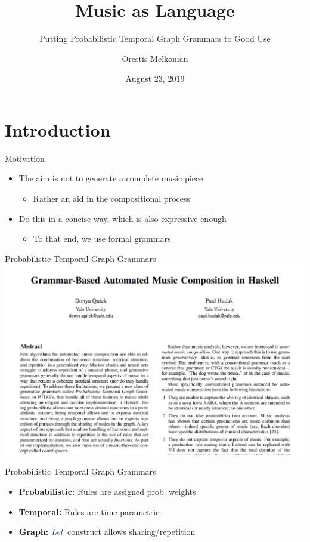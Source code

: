 \documentclass[aspectratio=43]{beamer}
\title{Music as Language}
\subtitle{Putting Probabilistic Temporal Graph Grammars to Good Use}
\author{Orestis Melkonian}
\date{August 23, 2019}
\institute{Utrecht University, The Netherlands}
\newcommand*{\mathcolor}{}
\def\mathcolor#1#{\mathcoloraux{#1}}
\newcommand*{\mathcoloraux}[3]{%
  \protect\leavevmode
  \begingroup
    \color#1{#2}#3%
  \endgroup
}
\newcommand{\HSCon}[1]{\mathcolor{hsblue3}{#1}}
\begin{document}
\begin{center}
\maketitle
\end{center}

\section{Introduction}

\begin{frame}{Motivation}
\begin{itemize}
\item The aim is not to generate a complete music piece
  \begin{itemize}
  \item Rather an aid in the compositional process
  \end{itemize}
\item Do this in a concise way, which is also expressive enough
  \begin{itemize}
  \item To that end, we use formal grammars
  \end{itemize}
\end{itemize}
\end{frame}

\begin{frame}{Probabilistic Temporal Graph Grammars}
\centering
\includegraphics[keepaspectratio=true,height=.5\paperheight]{source-ptgg.png}
\end{frame}

\begin{frame}{Probabilistic Temporal Graph Grammars}
\begin{itemize}
\item \textbf{Probabilistic:} Rules are assigned prob. weights
\item \textbf{Temporal:} Rules are time-parametric
\item \textbf{Graph:} \ensuremath{\HSCon{Let}} construct allows sharing/repetition
\end{itemize}
\end{frame}
\end{document}
